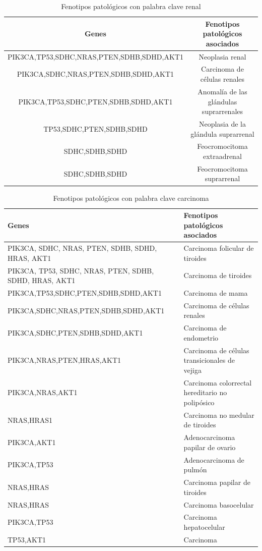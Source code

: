 \begin{table}[h]
	\centering
	\caption{Fenotipos patológicos con palabra clave renal}
	\begin{tabular}{|c|c|}
		\hline
		\textbf{Genes} & \textbf{Fenotipos patológicos asociados} \\
		\hline
		PIK3CA,TP53,SDHC,NRAS,PTEN,SDHB,SDHD,AKT1 & Neoplasia renal \\
		\hline
		PIK3CA,SDHC,NRAS,PTEN,SDHB,SDHD,AKT1 & Carcinoma de células renales \\
		\hline
		PIK3CA,TP53,SDHC,PTEN,SDHB,SDHD,AKT1 & Anomalía de las glándulas suprarrenales \\
		\hline
		TP53,SDHC,PTEN,SDHB,SDHD & Neoplasia de la glándula suprarrenal \\
		\hline
		SDHC,SDHB,SDHD & Feocromocitoma extraadrenal \\
		\hline
		SDHC,SDHB,SDHD & Feocromocitoma suprarrenal \\
		\hline
	\end{tabular}
\end{table}

\begin{table}[h]
	\centering
	\caption{Fenotipos patológicos con palabra clave carcinoma}
	\begin{tabular}{|p{3cm}|p{4cm}|}
		\hline
		\textbf{Genes} & \textbf{Fenotipos patológicos asociados} \\
		\hline
		PIK3CA, SDHC, NRAS, PTEN, SDHB, SDHD, HRAS, AKT1 & Carcinoma folicular de tiroides \\
		\hline
		PIK3CA, TP53, SDHC, NRAS, PTEN, SDHB, SDHD, HRAS, AKT1 & Carcinoma de tiroides \\
		\hline
		PIK3CA,TP53,SDHC,PTEN,SDHB,SDHD,AKT1 & Carcinoma de mama \\
		\hline
		PIK3CA,SDHC,NRAS,PTEN,SDHB,SDHD,AKT1 & Carcinoma de células renales \\
		\hline
		PIK3CA,SDHC,PTEN,SDHB,SDHD,AKT1 & Carcinoma de endometrio \\
		\hline
		PIK3CA,NRAS,PTEN,HRAS,AKT1 & Carcinoma de células transicionales de vejiga \\
		\hline
		PIK3CA,NRAS,AKT1 & Carcinoma colorrectal hereditario no polipósico \\
		\hline
		NRAS,HRAS1 & Carcinoma no medular de tiroides \\
		\hline
		PIK3CA,AKT1 & Adenocarcinoma papilar de ovario \\
		\hline
		PIK3CA,TP53 & Adenocarcinoma de pulmón \\
		\hline
		NRAS,HRAS & Carcinoma papilar de tiroides \\
		\hline
		NRAS,HRAS & Carcinoma basocelular \\
		\hline
		PIK3CA,TP53 & Carcinoma hepatocelular \\
		\hline
		TP53,AKT1 & Carcinoma \\
		\hline
	\end{tabular}
\end{table}

